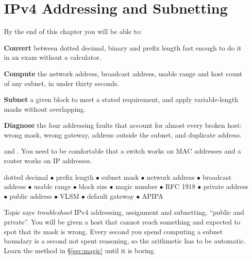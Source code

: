\chapter{IPv4 Addressing and Subnetting}\label{ch:ipv4}

\begin{outcomes}
By the end of this chapter you will be able to:
\begin{tight}
  \item \textbf{Convert} between dotted decimal, binary and prefix length fast
        enough to do it in an exam without a calculator.
  \item \textbf{Compute} the network address, broadcast address, usable range and
        host count of any subnet, in under thirty seconds.
  \item \textbf{Subnet} a given block to meet a stated requirement, and apply
        variable-length masks without overlapping.
  \item \textbf{Diagnose} the four addressing faults that account for almost every
        broken host: wrong mask, wrong gateway, address outside the subnet, and
        duplicate address.
\end{tight}
\end{outcomes}

\begin{prereq}
 and . You need to be comfortable that a switch
works on MAC addresses and a router works on IP addresses.
\end{prereq}

\begin{keyterms}
dotted decimal $\bullet$ prefix length $\bullet$ subnet mask $\bullet$ network
address $\bullet$ broadcast address $\bullet$ usable range $\bullet$ block size
$\bullet$ magic number $\bullet$ RFC 1918 $\bullet$ private address $\bullet$
public address $\bullet$ VLSM $\bullet$ default gateway $\bullet$ APIPA
\end{keyterms}

\begin{examnote}
Topic  says \emph{troubleshoot} IPv4 addressing, assignment and
subnetting, ``public and private''. You will be given a host that cannot reach
something and expected to spot that its mask is wrong. Every second you spend
computing a subnet boundary is a second not spent reasoning, so the arithmetic
has to be automatic. Learn the method in §\ref{sec:magic} until it is boring.
\end{examnote}

